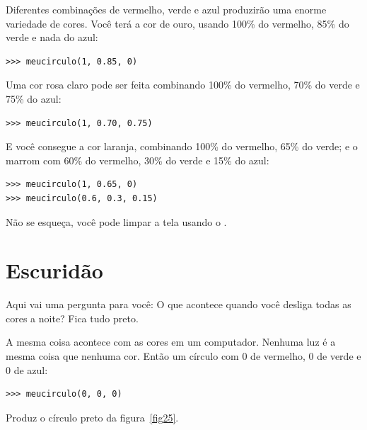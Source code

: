 \noindent
Diferentes combinações de vermelho, verde e azul produzirão uma enorme variedade de cores. Você terá a cor de ouro, usando 100\% do vermelho, 85\% do verde e nada do azul:

\begin{listing}
\begin{verbatim}
>>> meucirculo(1, 0.85, 0)
\end{verbatim}
\end{listing}

\noindent
Uma cor rosa claro pode ser feita combinando 100\% do vermelho, 70\% do verde e 75\% do azul:

\begin{listing}
\begin{verbatim}
>>> meucirculo(1, 0.70, 0.75)
\end{verbatim}
\end{listing}

\noindent
E você consegue a cor laranja, combinando 100\% do vermelho, 65\% do verde; e o marrom com 60\% do vermelho, 30\% do verde e 15\% do azul:

\begin{listing}
\begin{verbatim}
>>> meucirculo(1, 0.65, 0)
>>> meucirculo(0.6, 0.3, 0.15)
\end{verbatim}
\end{listing}

\noindent
Não se esqueça, você pode limpar a tela usando o .

\section{Escuridão}

Aqui vai uma pergunta para você: O que acontece quando você desliga todas as cores a noite? Fica tudo preto.
\par
A mesma coisa acontece com as cores em um computador. Nenhuma luz é a mesma coisa que nenhuma cor. Então um círculo com 0 de vermelho, 0 de verde e 0 de azul:

\begin{listing}
\begin{verbatim}
>>> meucirculo(0, 0, 0)
\end{verbatim}
\end{listing}

Produz o círculo preto da figura~\ref{fig25}.

